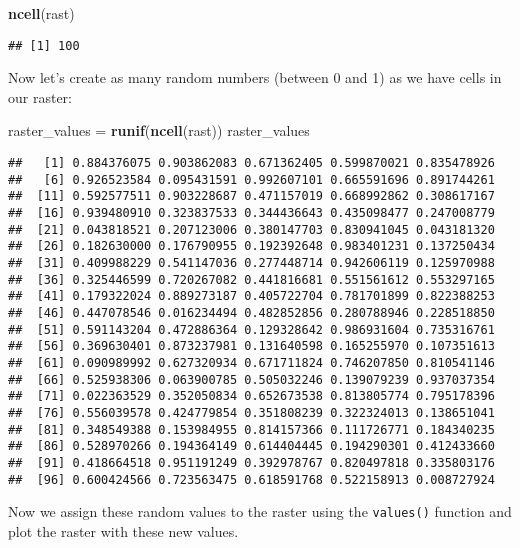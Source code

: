 \documentclass[]{article}
\newenvironment{Shaded}{\begin{snugshade}}{\end{snugshade}}
\newcommand{\KeywordTok}[1]{\textcolor[rgb]{0.13,0.29,0.53}{\textbf{#1}}}
\newcommand{\NormalTok}[1]{#1}
\newcommand{\StringTok}[1]{\textcolor[rgb]{0.31,0.60,0.02}{#1}}
\begin{document}
\begin{Shaded}
\begin{Highlighting}[]
\KeywordTok{ncell}\NormalTok{(rast)}
\end{Highlighting}
\end{Shaded}

\begin{verbatim}
## [1] 100
\end{verbatim}

Now let's create as many random numbers (between 0 and 1) as we have
cells in our raster:

\begin{Shaded}
\begin{Highlighting}[]
\NormalTok{raster_values =}\StringTok{ }\KeywordTok{runif}\NormalTok{(}\KeywordTok{ncell}\NormalTok{(rast))}
\NormalTok{raster_values}
\end{Highlighting}
\end{Shaded}

\begin{verbatim}
##   [1] 0.884376075 0.903862083 0.671362405 0.599870021 0.835478926
##   [6] 0.926523584 0.095431591 0.992607101 0.665591696 0.891744261
##  [11] 0.592577511 0.903228687 0.471157019 0.668992862 0.308617167
##  [16] 0.939480910 0.323837533 0.344436643 0.435098477 0.247008779
##  [21] 0.043818521 0.207123006 0.380147703 0.830941045 0.043181320
##  [26] 0.182630000 0.176790955 0.192392648 0.983401231 0.137250434
##  [31] 0.409988229 0.541147036 0.277448714 0.942606119 0.125970988
##  [36] 0.325446599 0.720267082 0.441816681 0.551561612 0.553297165
##  [41] 0.179322024 0.889273187 0.405722704 0.781701899 0.822388253
##  [46] 0.447078546 0.016234494 0.482852856 0.280788946 0.228518850
##  [51] 0.591143204 0.472886364 0.129328642 0.986931604 0.735316761
##  [56] 0.369630401 0.873237981 0.131640598 0.165255970 0.107351613
##  [61] 0.090989992 0.627320934 0.671711824 0.746207850 0.810541146
##  [66] 0.525938306 0.063900785 0.505032246 0.139079239 0.937037354
##  [71] 0.022363529 0.352050834 0.652673538 0.813805774 0.795178396
##  [76] 0.556039578 0.424779854 0.351808239 0.322324013 0.138651041
##  [81] 0.348549388 0.153984955 0.814157366 0.111726771 0.184340235
##  [86] 0.528970266 0.194364149 0.614404445 0.194290301 0.412433660
##  [91] 0.418664518 0.951191249 0.392978767 0.820497818 0.335803176
##  [96] 0.600424566 0.723563475 0.618591768 0.522158913 0.008727924
\end{verbatim}

Now we assign these random values to the raster using the
\texttt{values()} function and plot the raster with these new values.
\end{document}
